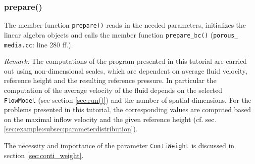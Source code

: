 \documentclass{article}
\begin{document}
\subsubsection{prepare()}

The member function \texttt{prepare()} reads in the needed parameters, initializes the linear algebra
objects and calls the member function \texttt{prepare\_bc()} (\texttt{porous\_ media.cc}: line 280 ff.).

\emph{Remark:}
The computations of the program presented in this tutorial are carried out using non-dimensional scales, which are dependent on average fluid velocity, reference height and the resulting reference pressure. In particular the computation of the average velocity of the fluid depends on the selected \texttt{FlowModel} (see section \ref{sec:run()}) and the number of spatial dimensions. For the problems presented in this tutorial, the corresponding values are computed based on the maximal inflow velocity and the given reference height (cf. sec. \ref{sec:example:subsec:parameterdistribution}).

The necessity and importance of the parameter \texttt{ContiWeight} is discussed in section \ref{sec:conti_weight}.
\end{document}
